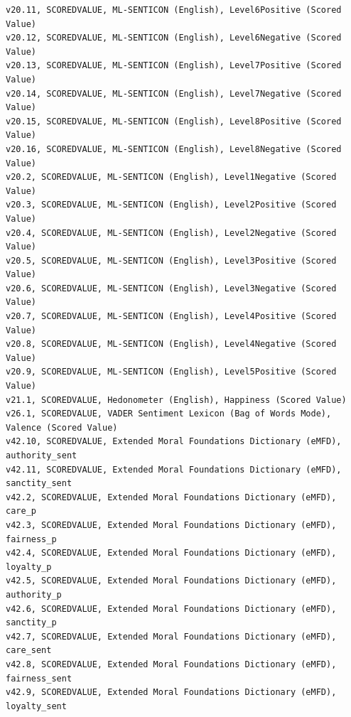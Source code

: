 \documentclass[12pt]{article}
\begin{document}
\begin{verbatim}
v20.11, SCOREDVALUE, ML-SENTICON (English), Level6Positive (Scored Value)
v20.12, SCOREDVALUE, ML-SENTICON (English), Level6Negative (Scored Value)
v20.13, SCOREDVALUE, ML-SENTICON (English), Level7Positive (Scored Value)
v20.14, SCOREDVALUE, ML-SENTICON (English), Level7Negative (Scored Value)
v20.15, SCOREDVALUE, ML-SENTICON (English), Level8Positive (Scored Value)
v20.16, SCOREDVALUE, ML-SENTICON (English), Level8Negative (Scored Value)
v20.2, SCOREDVALUE, ML-SENTICON (English), Level1Negative (Scored Value)
v20.3, SCOREDVALUE, ML-SENTICON (English), Level2Positive (Scored Value)
v20.4, SCOREDVALUE, ML-SENTICON (English), Level2Negative (Scored Value)
v20.5, SCOREDVALUE, ML-SENTICON (English), Level3Positive (Scored Value)
v20.6, SCOREDVALUE, ML-SENTICON (English), Level3Negative (Scored Value)
v20.7, SCOREDVALUE, ML-SENTICON (English), Level4Positive (Scored Value)
v20.8, SCOREDVALUE, ML-SENTICON (English), Level4Negative (Scored Value)
v20.9, SCOREDVALUE, ML-SENTICON (English), Level5Positive (Scored Value)
v21.1, SCOREDVALUE, Hedonometer (English), Happiness (Scored Value)
v26.1, SCOREDVALUE, VADER Sentiment Lexicon (Bag of Words Mode), Valence (Scored Value)
v42.10, SCOREDVALUE, Extended Moral Foundations Dictionary (eMFD), authority_sent
v42.11, SCOREDVALUE, Extended Moral Foundations Dictionary (eMFD), sanctity_sent
v42.2, SCOREDVALUE, Extended Moral Foundations Dictionary (eMFD), care_p
v42.3, SCOREDVALUE, Extended Moral Foundations Dictionary (eMFD), fairness_p
v42.4, SCOREDVALUE, Extended Moral Foundations Dictionary (eMFD), loyalty_p
v42.5, SCOREDVALUE, Extended Moral Foundations Dictionary (eMFD), authority_p
v42.6, SCOREDVALUE, Extended Moral Foundations Dictionary (eMFD), sanctity_p
v42.7, SCOREDVALUE, Extended Moral Foundations Dictionary (eMFD), care_sent
v42.8, SCOREDVALUE, Extended Moral Foundations Dictionary (eMFD), fairness_sent
v42.9, SCOREDVALUE, Extended Moral Foundations Dictionary (eMFD), loyalty_sent
\end{verbatim}
\end{document}
